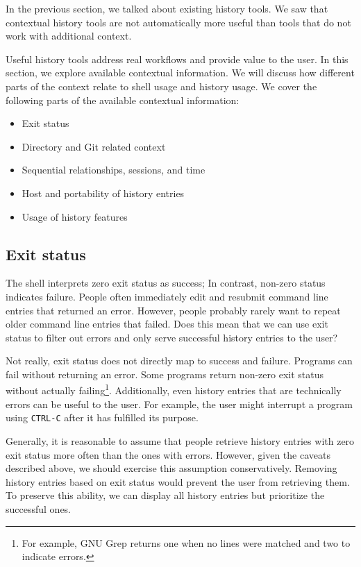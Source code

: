 In the previous section, we talked about existing history tools. We saw that contextual history tools are not automatically more useful than tools that do not work with additional context. 

Useful history tools address real workflows and provide value to the user.
In this section, we explore available contextual information. We will discuss how different parts of the context relate to shell usage and history usage. %
We cover the following parts of the available contextual information:

\begin{itemize}
    \item Exit status
    \item Directory and Git related context
    \item Sequential relationships, sessions, and time
    \item Host and portability of history entries
    \item Usage of history features
\end{itemize}

\subsection{Exit status}

The shell interprets zero exit status as success; In contrast, non-zero status indicates failure.\cite{bashman} People often immediately edit and resubmit command line entries that returned an error. However, people probably rarely want to repeat older command line entries that failed. Does this mean that we can use exit status to filter out errors and only serve successful history entries to the user?

Not really, exit status does not directly map to success and failure. Programs can fail without returning an error. Some programs return non-zero exit status without actually failing\footnote{For example, GNU Grep returns one when no lines were matched and two to indicate errors.\cite{man-grep}}. 
Additionally, even history entries that are technically errors can be useful to the user. For example, the user might interrupt a program using \verb|CTRL-C| after it has fulfilled its purpose.

Generally, it is reasonable to assume that people retrieve history entries with zero exit status more often than the ones with errors. However, given the caveats described above, we should exercise this assumption conservatively. Removing history entries based on exit status would prevent the user from retrieving them. To preserve this ability, we can display all history entries but prioritize the successful ones.

